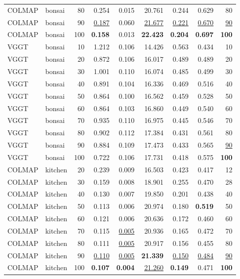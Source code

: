 \begin{table}[H]
\begin{tabular}{llrrrrrrr}
COLMAP & bonsai & 80 & 0.254 & 0.015 & 20.761 & 0.244 & 0.629 & 80 \\
COLMAP & bonsai & 90 & \underline{0.187} & 0.060 & \underline{21.677} & \underline{0.221} & \underline{0.670} & \underline{90} \\
COLMAP & bonsai & 100 & \textbf{0.158} & 0.013 & \textbf{22.423} & \textbf{0.204} & \textbf{0.697} & \textbf{100} \\
VGGT & bonsai & 10 & 1.212 & 0.106 & 14.426 & 0.563 & 0.434 & 10 \\
VGGT & bonsai & 20 & 0.872 & 0.106 & 16.017 & 0.489 & 0.489 & 20 \\
VGGT & bonsai & 30 & 1.001 & 0.110 & 16.074 & 0.485 & 0.499 & 30 \\
VGGT & bonsai & 40 & 0.891 & 0.104 & 16.336 & 0.469 & 0.516 & 40 \\
VGGT & bonsai & 50 & 0.864 & 0.100 & 16.562 & 0.459 & 0.528 & 50 \\
VGGT & bonsai & 60 & 0.864 & 0.103 & 16.860 & 0.449 & 0.540 & 60 \\
VGGT & bonsai & 70 & 0.935 & 0.110 & 16.975 & 0.445 & 0.546 & 70 \\
VGGT & bonsai & 80 & 0.902 & 0.112 & 17.384 & 0.431 & 0.561 & 80 \\
VGGT & bonsai & 90 & 0.884 & 0.109 & 17.473 & 0.433 & 0.565 & \underline{90} \\
VGGT & bonsai & 100 & 0.722 & 0.106 & 17.731 & 0.418 & 0.575 & \textbf{100} \\
\midrule
COLMAP & kitchen & 20 & 0.239 & 0.009 & 16.503 & 0.423 & 0.417 & 12 \\
COLMAP & kitchen & 30 & 0.159 & 0.008 & 18.901 & 0.255 & 0.470 & 28 \\
COLMAP & kitchen & 40 & 0.130 & 0.007 & 19.850 & 0.201 & 0.438 & 40 \\
COLMAP & kitchen & 50 & 0.113 & 0.006 & 20.974 & 0.180 & \textbf{0.519} & 50 \\
COLMAP & kitchen & 60 & 0.121 & 0.006 & 20.636 & 0.172 & 0.460 & 60 \\
COLMAP & kitchen & 70 & 0.115 & \underline{0.005} & 20.936 & 0.165 & 0.472 & 70 \\
COLMAP & kitchen & 80 & 0.111 & \underline{0.005} & 20.917 & 0.156 & 0.455 & 80 \\
COLMAP & kitchen & 90 & \underline{0.110} & \underline{0.005} & \textbf{21.339} & \underline{0.150} & \underline{0.484} & \underline{90} \\
COLMAP & kitchen & 100 & \textbf{0.107} & \textbf{0.004} & \underline{21.260} & \textbf{0.149} & 0.471 & \textbf{100} \\

\end{tabular}
\end{table}
